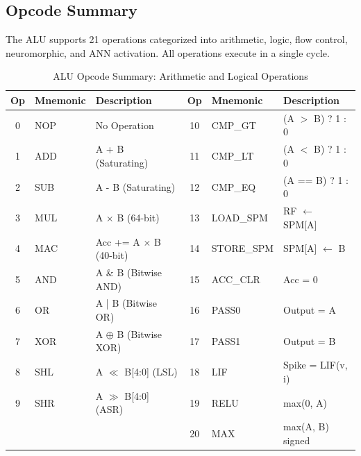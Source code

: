 \subsection{Opcode Summary}
The ALU supports 21 operations categorized into arithmetic, logic, flow control, neuromorphic, and ANN activation. All operations execute in a single cycle.

\begin{table}[ht!]
\centering
\singlespacing
\small
\renewcommand{\arraystretch}{1.1}
\caption{ALU Opcode Summary: Arithmetic and Logical Operations}
\label{tab:isa_opcodes}
\begin{tabular}{|c|l|l||c|l|l|}
\hline
\textbf{Op} & \textbf{Mnemonic} & \textbf{Description} & \textbf{Op} & \textbf{Mnemonic} & \textbf{Description} \\ \hline
0 & NOP & No Operation & 10 & CMP\_GT & (A $>$ B) ? 1 : 0 \\
1 & ADD & A + B (Saturating) & 11 & CMP\_LT & (A $<$ B) ? 1 : 0 \\
2 & SUB & A - B (Saturating) & 12 & CMP\_EQ & (A == B) ? 1 : 0 \\
3 & MUL & A $\times$ B (64-bit) & 13 & LOAD\_SPM & RF $\leftarrow$ SPM[A] \\
4 & MAC & Acc += A $\times$ B (40-bit) & 14 & STORE\_SPM & SPM[A] $\leftarrow$ B \\
5 & AND & A \& B (Bitwise AND) & 15 & ACC\_CLR & Acc = 0 \\
6 & OR & A | B (Bitwise OR) & 16 & PASS0 & Output = A \\
7 & XOR & A $\oplus$ B (Bitwise XOR) & 17 & PASS1 & Output = B \\
8 & SHL & A $\ll$ B[4:0] (LSL) & 18 & LIF & Spike = LIF(v, i) \\
9 & SHR & A $\gg$ B[4:0] (ASR) & 19 & RELU & max(0, A) \\
 &  &  & 20 & MAX & max(A, B) signed \\ \hline
\end{tabular}
\end{table}
